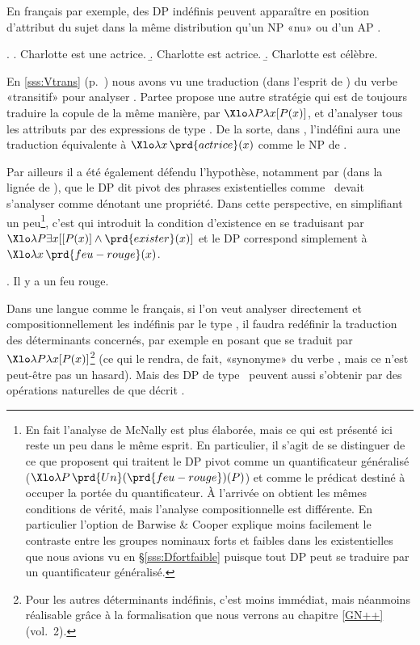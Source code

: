 \largerpage

En français par exemple, des DP indéfinis peuvent apparaître en position d'attribut du sujet \Next[a] dans la même distribution qu'un NP «nu» \Next[b] ou d'un AP \Next[c].

\ex.
\a.  Charlotte est une actrice.
\b. Charlotte est actrice.
\b. Charlotte est célèbre.


En \ref{sss:Vtrans} (p.~\pageref{x:spiderman2}) nous avons vu une traduction (dans l'esprit de \citealt{PTQ}) du verbe  «transitif» pour analyser \Last[a].  Partee propose une autre stratégie qui est de toujours traduire la copule de la même manière, par $\Xlo\lambda P\lambda x[P(x)]$, et d'analyser tous les attributs par des expressions de type \et. %
De la sorte, dans \Last[a], l'indéfini  aura une traduction équivalente à $\Xlo\lambda x\,\prd{actrice}(x)$
comme le NP  de \Last[b].

Par ailleurs il a été également défendu l'hypothèse, notamment par \citet{McNally:92phd,McNally:98} (dans la lignée de \citealt{Milsark:77}), que le DP dit pivot des phrases existentielles comme \Next\ devait s'analyser comme dénotant une propriété.
Dans cette perspective, en simplifiant un peu\footnote{En fait l'analyse de McNally est plus élaborée, mais  ce qui est présenté ici reste un peu dans le même esprit. En particulier, il s'agit de se distinguer de ce que proposent \citet{BarwiseCooper:81} qui traitent le DP pivot comme un quantificateur généralisé ($\Xlo\lambda P\,\prd{Un}(\prd{feu-rouge})(P)$) et  comme le prédicat   destiné à occuper la portée du quantificateur. À l'arrivée on obtient les mêmes conditions de vérité, mais l'analyse compositionnelle est différente. En particulier l'option de Barwise \& Cooper explique moins facilement le contraste entre les groupes nominaux forts et faibles dans les existentielles que nous avions vu en \S\ref{sss:Dfortfaible} puisque tout DP peut se traduire par un quantificateur généralisé.}, 
c'est  qui introduit la condition d'existence en se traduisant par $\Xlo\lambda P\exists x[[P(x)]\wedge\prd{exister}(x)]$ et le DP correspond simplement à $\Xlo\lambda x\,\prd{feu-rouge}(x)$.

\ex.
Il y a un feu rouge.


Dans une langue comme le français, si l'on veut analyser directement et compositionnellement les indéfinis par le type \et, il faudra redéfinir la traduction des déterminants concernés, par exemple en posant que  se traduit par $\Xlo\lambda P\lambda x [P(x)]$\footnote{Pour les autres déterminants indéfinis, c'est moins immédiat, mais néanmoins réalisable grâce à la formalisation que nous verrons au chapitre \ref{GN++} (vol.~2).} (ce qui le rendra, de fait, «synonyme» du verbe , mais ce n'est peut-être pas un hasard).  Mais des DP de type \et\ peuvent aussi s'obtenir par des opérations naturelles de  que décrit \citet{Partee:87}.


